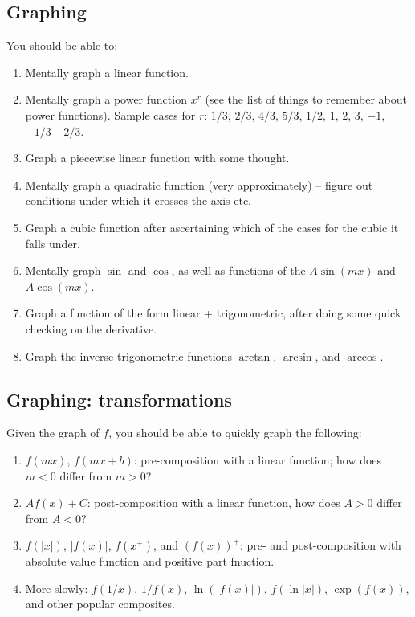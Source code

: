 \documentclass[10pt]{amsart}
\begin{document}
\subsection{Graphing}

You should be able to:

\begin{enumerate}
\item Mentally graph a linear function.
\item Mentally graph a power function $x^r$ (see the list of things to
  remember about power functions). Sample cases for $r$: $1/3$, $2/3$,
  $4/3$, $5/3$, $1/2$, $1$, $2$, $3$, $-1$, $-1/3$ $-2/3$.
\item Graph a piecewise linear function with some thought.
\item Mentally graph a quadratic function (very approximately) --
  figure out conditions under which it crosses the axis etc.
\item Graph a cubic function after ascertaining which of the cases for
  the cubic it falls under.
\item Mentally graph $\sin$ and $\cos$, as well as functions of the $A
  \sin(mx)$ and $A\cos(mx)$.
\item Graph a function of the form linear + trigonometric, after doing
  some quick checking on the derivative.
\item Graph the inverse trigonometric functions $\arctan$, $\arcsin$,
  and $\arccos$.
\end{enumerate}

\subsection{Graphing: transformations}

Given the graph of $f$, you should be able to quickly graph the following:

\begin{enumerate}
\item $f(mx)$, $f(mx + b)$: pre-composition with a linear function;
  how does $m < 0$ differ from $m > 0$?
\item $Af(x) + C$: post-composition with a linear function, how does
  $A > 0$ differ from $A < 0$?
\item $f(|x|)$, $|f(x)|$, $f(x^+)$, and $(f(x))^+$: pre- and
  post-composition with absolute value function and positive part
  fnuction.
\item More slowly: $f(1/x)$, $1/f(x)$, $\ln(|f(x)|)$, $f(\ln|x|)$,
  $\exp(f(x))$, and other popular composites.
\end{enumerate}
\end{document}
